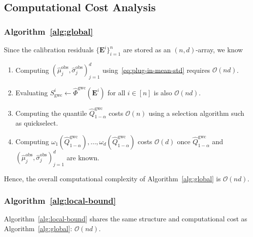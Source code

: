 \FloatBarrier

\subsection{Computational Cost Analysis}\label{app:alg-and-cost}

\subsubsection{Algorithm~\ref{alg:global}}
\label{app:gwc-cost}
Since the calibration residuals $\{\mathbf{E}^i\}_{i=1}^{n}$ are stored as an $(n,d)$-array, we know
\begin{enumerate}
    \item Computing $(\hat\mu^{\mathrm{obs}}_j,\hat\sigma^{\mathrm{obs}}_j)_{j=1}^d$ using~\eqref{eq:plug-in-mean-std} requires $\mathcal O(nd)$.
    \item Evaluating $S^i_{\mathrm{gwc}}\gets \hat{\Phi}^{\mathrm{gwc}}(\mathbf{E}^i)$ for all $i\in[n]$ is also $\mathcal O(nd)$.
    \item Computing the quantile $\hat{Q}^{\mathrm{gwc}}_{1-\alpha}$ costs $\mathcal O(n)$ using a selection algorithm such as quickselect. 
    \item Computing $\omega_1(\hat{Q}^{\mathrm{gwc}}_{1-\alpha}),\ldots,\omega_d(\hat{Q}^{\mathrm{gwc}}_{1-\alpha})$ costs $\mathcal{O}(d)$ once $\hat{Q}^{\mathrm{gwc}}_{1-\alpha}$ and $(\hat\mu^{\mathrm{obs}}_j,\hat\sigma^{\mathrm{obs}}_j)_{j=1}^d$ are known.
\end{enumerate}
Hence, the overall computational complexity of Algorithm~\ref{alg:global} is $\mathcal O(nd)$.

\subsubsection{Algorithm~\ref{alg:local-bound}}
\label{app:lwc-local-bound}

Algorithm~\ref{alg:local-bound} shares the same structure and computational cost as Algorithm~\ref{alg:global}: $\mathcal O(nd)$.

